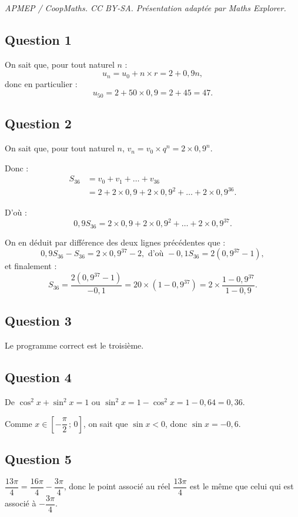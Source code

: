 \documentclass[10pt]{article}
\begin{document}
\noindent\textit{APMEP / CoopMaths. CC BY-SA. Présentation adaptée par Maths Explorer.}\par\medskip
\subsection*{Question 1}

On sait que, pour tout naturel \(n\) :
\[
u_n = u_0 + n \times r = 2 + 0{,}9n,
\]
donc en particulier :
\[
u_{50} = 2 + 50 \times 0{,}9 = 2 + 45 = 47.
\]

\subsection*{Question 2}

On sait que, pour tout naturel \(n\), \(v_n = v_0 \times q^n = 2 \times 0{,}9^n\).

Donc :
\begin{align*}
S_{36} &= v_0 + v_1 + \ldots + v_{36} \\
&= 2 + 2 \times 0{,}9 + 2 \times 0{,}9^2 + \ldots + 2 \times 0{,}9^{36}.
\end{align*}

D'où :
\[
0{,}9 S_{36} = 2 \times 0{,}9 + 2 \times 0{,}9^2 + \ldots + 2 \times 0{,}9^{37}.
\]

On en déduit par différence des deux lignes précédentes que :
\[
0{,}9 S_{36} - S_{36} = 2 \times 0{,}9^{37} - 2, \text{ d'où } -0{,}1 S_{36} = 2 \left(0{,}9^{37} - 1\right),
\]
et finalement :
\[
S_{36} = \dfrac{2 \left(0{,}9^{37} - 1\right)}{-0{,}1} = 20 \times (1 - 0{,}9^{37}) = 2 \times \dfrac{1 - 0{,}9^{37}}{1 - 0{,}9}.
\]

\subsection*{Question 3}

Le programme correct est le troisième.

\subsection*{Question 4}

De \( \cos^2 x + \sin^2 x = 1 \) ou \( \sin^2 x = 1 - \cos^2 x = 1 - 0{,}64 = 0{,}36 \).

Comme \( x \in \left[-\dfrac{\pi}{2} \,;\, 0\right] \), on sait que \( \sin x < 0 \), donc \( \sin x = -0{,}6 \).

\subsection*{Question 5}

\(\dfrac{13\pi}{4} = \dfrac{16\pi}{4} - \dfrac{3\pi}{4}\), donc le point associé au réel \( \dfrac{13\pi}{4} \) est le même que celui qui est associé à \( -\dfrac{3\pi}{4} \).
\end{document}

